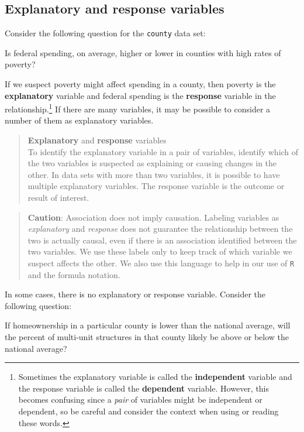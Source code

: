 \documentclass[
  letterpaper,
  DIV=11,
  numbers=noendperiod]{scrreprt}
\begin{document}
\subsection{Explanatory and response
variables}\label{explanatory-and-response-variables}

Consider the following question for the \texttt{county} data set:

Is federal spending, on average, higher or lower in counties with high
rates of poverty?

If we suspect poverty might affect spending in a county, then poverty is
the \textbf{explanatory} variable and federal spending is the
\textbf{response} variable in the relationship.\footnote{Sometimes the
  explanatory variable is called the \textbf{independent} variable and
  the response variable is called the \textbf{dependent} variable.
  However, this becomes confusing since a \emph{pair} of variables might
  be independent or dependent, so be careful and consider the context
  when using or reading these words.} If there are many variables, it
may be possible to consider a number of them as explanatory variables.

\begin{quote}
\textbf{Explanatory} and \textbf{response} variables\\
To identify the explanatory variable in a pair of variables, identify
which of the two variables is suspected as explaining or causing changes
in the other. In data sets with more than two variables, it is possible
to have multiple explanatory variables. The response variable is the
outcome or result of interest.
\end{quote}

\begin{quote}
\textbf{Caution}: Association does not imply causation. Labeling
variables as \emph{explanatory} and \emph{response} does not guarantee
the relationship between the two is actually causal, even if there is an
association identified between the two variables. We use these labels
only to keep track of which variable we suspect affects the other. We
also use this language to help in our use of \texttt{R} and the formula
notation.
\end{quote}

In some cases, there is no explanatory or response variable. Consider
the following question:

If homeownership in a particular county is lower than the national
average, will the percent of multi-unit structures in that county likely
be above or below the national average?
\end{document}
